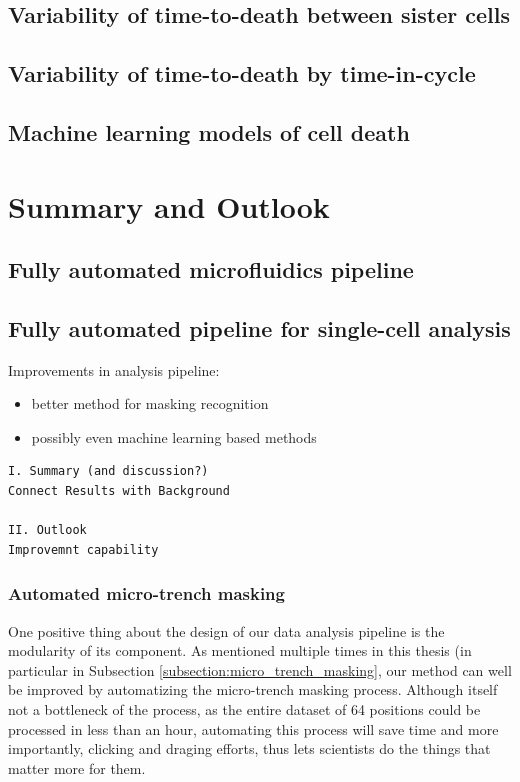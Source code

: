 \documentclass[pdftex,12pt,a4paper]{report}
\begin{document}
\section{Variability of time-to-death between sister cells}

\section{Variability of time-to-death by time-in-cycle}

\section{Machine learning models of cell death}
\label{section:ml_results}

\chapter{Summary and Outlook}


\section{Fully automated microfluidics pipeline}

\section{Fully automated pipeline for single-cell analysis}


Improvements in analysis pipeline:

\begin{itemize}
\item better method for masking recognition
\item possibly even machine learning based methods
\end{itemize}

\begin{verbatim}
I. Summary (and discussion?)
Connect Results with Background

II. Outlook
Improvemnt capability
\end{verbatim}

\subsection{Automated micro-trench masking}

One positive thing about the design of our data analysis pipeline is the modularity of its component. As mentioned multiple times in this thesis (in particular in Subsection \ref{subsection:micro_trench_masking}, our method can well be improved by automatizing the micro-trench masking process. Although itself not a bottleneck of the process, as the entire dataset of 64 positions could be processed in less than an hour, automating this process will save time and more importantly, clicking and draging efforts, thus lets scientists do the things that matter more for them.
\end{document}
